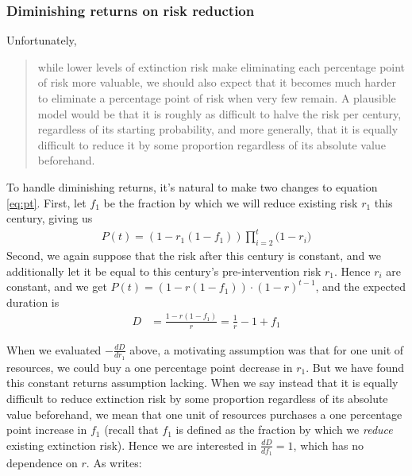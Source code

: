 \documentclass[british]{article}
\begin{document}
\subsubsection{Diminishing returns on risk reduction}\label{header-n123} Unfortunately, 
\begin{quote}
while lower levels of extinction risk make eliminating each percentage point of risk more valuable, we should also expect that it becomes much
harder to eliminate a percentage point of risk when very few remain. A plausible model would be that it is roughly as difficult to
halve the risk per century, regardless of its starting probability, and
more generally, that it is equally difficult to reduce it by some
proportion regardless of its absolute value beforehand. \citep{ord_modelling_2014}
\end{quote}

To handle diminishing returns, it's natural to make two changes to equation \ref{eq:pt}. First, let $f_1$ be the fraction by which we will reduce existing risk $r_1$ this century, giving us
\begin{align}
P(t) =  (1-r_1(1-f_1)) \prod_{i=2}^t {(1-r_i})\label{eq:dr}
\end{align}
Second, we again suppose that the risk after this century is constant, and we additionally let it be equal to this century's pre-intervention risk $r_1$. Hence $r_i$ are constant, and we get $P(t) = (1-r(1-f_1)) \cdot (1-r)^{t-1}$, and the expected duration is
\begin{align*}
D &= \frac{1 - r(1 - f_1)}{r} = \frac{1}{r} -1 +f_1
\end{align*}

When we evaluated \(-\frac{dD}{dr_1}\) above, a motivating assumption was that for one unit of resources, we could buy a one percentage point decrease in \(r_1\). But we have found this constant returns assumption lacking. When we say instead that it is equally difficult to reduce extinction risk by some proportion regardless of its absolute value beforehand, we mean that one unit of resources purchases a one percentage point increase in \(f_1\) (recall that \(f_1\) is defined as the fraction by which we \emph{reduce} existing extinction risk). Hence we are interested in $\frac{dD}{df_1}=1$, which has no dependence on \(r\). As \cite{ord_modelling_2014} writes:
\end{document}
